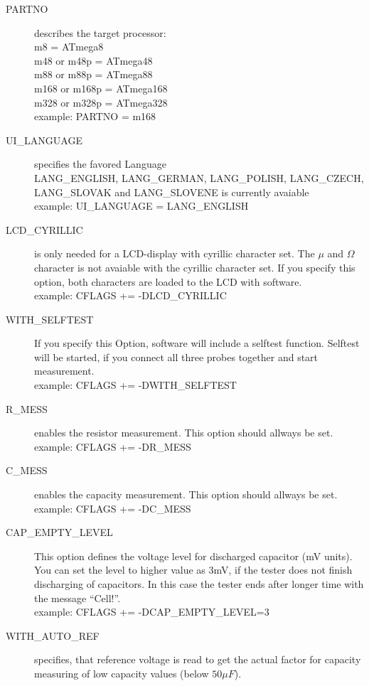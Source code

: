 \begin{description}
  \item[PARTNO] describes the target processor:\\
         m8 = ATmega8\\
         m48 or m48p = ATmega48\\
         m88 or m88p = ATmega88\\
         m168 or m168p = ATmega168\\
         m328 or m328p = ATmega328\\
    example:  PARTNO = m168
  \item[UI\_LANGUAGE] specifies the favored Language\\
    LANG\_ENGLISH, LANG\_GERMAN, LANG\_POLISH, LANG\_CZECH, LANG\_SLOVAK and LANG\_SLOVENE is currently avaiable \\
    example:  UI\_LANGUAGE = LANG\_ENGLISH
  \item[LCD\_CYRILLIC] is only needed for a LCD-display with cyrillic character set. The \(\mu\) and \(\Omega\) character
is not avaiable with the cyrillic character set.
If you specify this option, both characters are loaded to the LCD with software.\\
example: CFLAGS += -DLCD\_CYRILLIC
  \item[WITH\_SELFTEST] If you specify this Option, software will include a selftest function.
Selftest will be started, if you connect all three probes together and start measurement.\\
example: CFLAGS += -DWITH\_SELFTEST
  \item[R\_MESS] enables the resistor measurement. This option should allways be set.\\
example: CFLAGS += -DR\_MESS
  \item[C\_MESS] enables the capacity measurement. This option should allways be set.\\
example: CFLAGS += -DC\_MESS
  \item[CAP\_EMPTY\_LEVEL]  This option defines the voltage level for discharged capacitor (mV units).
You can set the level to higher value as 3mV, if the tester does not finish discharging of capacitors.
In this case the tester ends after longer time with the message ``Cell!''.\\
example: CFLAGS += -DCAP\_EMPTY\_LEVEL=3
  \item[WITH\_AUTO\_REF] specifies, that reference voltage is read to get the actual factor for capacity measuring of low capacity values (below \(50\mu F\)).\\

\end{description}

